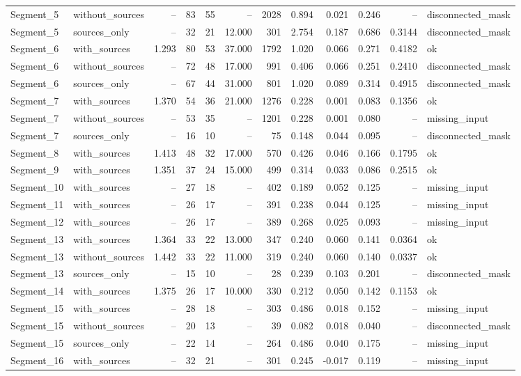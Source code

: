 \documentclass[10pt,a4paper]{article}
\begin{document}
\begin{longtable}{llrrrrrrrrrl}
Segment\_5 & without\_sources & -- & 83 & 55 & -- & 2028 & 0.894 & 0.021 & 0.246 & -- & disconnected\_mask \\
Segment\_5 & sources\_only & -- & 32 & 21 & 12.000 & 301 & 2.754 & 0.187 & 0.686 & 0.3144 & disconnected\_mask \\
Segment\_6 & with\_sources & 1.293 & 80 & 53 & 37.000 & 1792 & 1.020 & 0.066 & 0.271 & 0.4182 & ok \\
Segment\_6 & without\_sources & -- & 72 & 48 & 17.000 & 991 & 0.406 & 0.066 & 0.251 & 0.2410 & disconnected\_mask \\
Segment\_6 & sources\_only & -- & 67 & 44 & 31.000 & 801 & 1.020 & 0.089 & 0.314 & 0.4915 & disconnected\_mask \\
Segment\_7 & with\_sources & 1.370 & 54 & 36 & 21.000 & 1276 & 0.228 & 0.001 & 0.083 & 0.1356 & ok \\
Segment\_7 & without\_sources & -- & 53 & 35 & -- & 1201 & 0.228 & 0.001 & 0.080 & -- & missing\_input \\
Segment\_7 & sources\_only & -- & 16 & 10 & -- & 75 & 0.148 & 0.044 & 0.095 & -- & disconnected\_mask \\
Segment\_8 & with\_sources & 1.413 & 48 & 32 & 17.000 & 570 & 0.426 & 0.046 & 0.166 & 0.1795 & ok \\
Segment\_9 & with\_sources & 1.351 & 37 & 24 & 15.000 & 499 & 0.314 & 0.033 & 0.086 & 0.2515 & ok \\
Segment\_10 & with\_sources & -- & 27 & 18 & -- & 402 & 0.189 & 0.052 & 0.125 & -- & missing\_input \\
Segment\_11 & with\_sources & -- & 26 & 17 & -- & 391 & 0.238 & 0.044 & 0.125 & -- & missing\_input \\
Segment\_12 & with\_sources & -- & 26 & 17 & -- & 389 & 0.268 & 0.025 & 0.093 & -- & missing\_input \\
Segment\_13 & with\_sources & 1.364 & 33 & 22 & 13.000 & 347 & 0.240 & 0.060 & 0.141 & 0.0364 & ok \\
Segment\_13 & without\_sources & 1.442 & 33 & 22 & 11.000 & 319 & 0.240 & 0.060 & 0.140 & 0.0337 & ok \\
Segment\_13 & sources\_only & -- & 15 & 10 & -- & 28 & 0.239 & 0.103 & 0.201 & -- & disconnected\_mask \\
Segment\_14 & with\_sources & 1.375 & 26 & 17 & 10.000 & 330 & 0.212 & 0.050 & 0.142 & 0.1153 & ok \\
Segment\_15 & with\_sources & -- & 28 & 18 & -- & 303 & 0.486 & 0.018 & 0.152 & -- & missing\_input \\
Segment\_15 & without\_sources & -- & 20 & 13 & -- & 39 & 0.082 & 0.018 & 0.040 & -- & disconnected\_mask \\
Segment\_15 & sources\_only & -- & 22 & 14 & -- & 264 & 0.486 & 0.040 & 0.175 & -- & missing\_input \\
Segment\_16 & with\_sources & -- & 32 & 21 & -- & 301 & 0.245 & -0.017 & 0.119 & -- & missing\_input \\
\bottomrule
\end{longtable}
\normalsize
\clearpage
\end{document}
